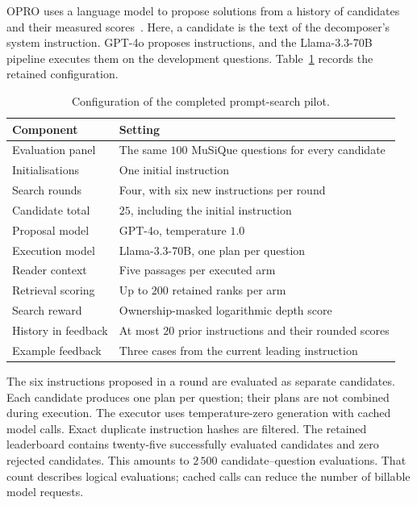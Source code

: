 OPRO uses a language model to propose solutions from a history of candidates
and their measured scores~\cite{ch5-opro}. Here, a candidate is the text of
the decomposer's system instruction. GPT-4o proposes instructions, and the
Llama-3.3-70B pipeline executes them on the development questions.
Table~\ref{tab:ch5-configuration} records the retained configuration.

\begin{table}[H]
\centering
\small
\caption{Configuration of the completed prompt-search pilot.}
\label{tab:ch5-configuration}
\begin{tabular}{p{}p{}}
\hline
Component & Setting \\
\hline
Evaluation panel & The same $100$ MuSiQue questions for every candidate \\
Initialisations & One initial instruction \\
Search rounds & Four, with six new instructions per round \\
Candidate total & $25$, including the initial instruction \\
Proposal model & GPT-4o, temperature $1.0$ \\
Execution model & Llama-3.3-70B, one plan per question \\
Reader context & Five passages per executed arm \\
Retrieval scoring & Up to $200$ retained ranks per arm \\
Search reward & Ownership-masked logarithmic depth score \\
History in feedback & At most $20$ prior instructions and their rounded scores \\
Example feedback & Three cases from the current leading instruction \\
\hline
\end{tabular}
\end{table}

The six instructions proposed in a round are evaluated as separate candidates.
Each candidate produces one plan per question; their plans are not combined
during execution. The executor uses temperature-zero generation with cached
model calls. Exact
duplicate instruction hashes are filtered. The retained leaderboard contains
twenty-five successfully evaluated candidates and zero rejected candidates.
This amounts to $2\,500$ candidate--question evaluations. That count describes
logical evaluations; cached calls can reduce the number of billable model
requests.

